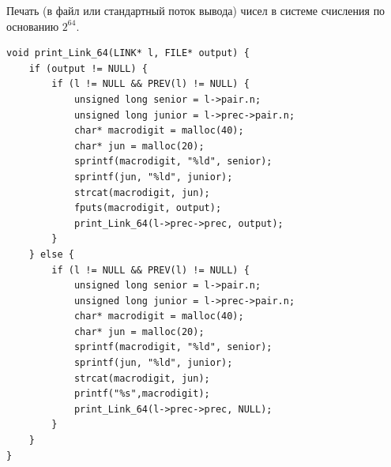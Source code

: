 \documentclass[14pt, russian]{scrartcl}
\begin{document}
\newpage
\begin{code}
\caption{Печать (в файл или стандартный поток вывода) чисел в системе счисления по основанию $2^{64}$.}
\label{lst:octaladd}
\begin{verbatim}
void print_Link_64(LINK* l, FILE* output) {
    if (output != NULL) {
        if (l != NULL && PREV(l) != NULL) {
            unsigned long senior = l->pair.n;
            unsigned long junior = l->prec->pair.n;
            char* macrodigit = malloc(40);
            char* jun = malloc(20);
            sprintf(macrodigit, "%ld", senior);
            sprintf(jun, "%ld", junior);
            strcat(macrodigit, jun);
            fputs(macrodigit, output);
            print_Link_64(l->prec->prec, output);
        }
    } else {
        if (l != NULL && PREV(l) != NULL) {
            unsigned long senior = l->pair.n;
            unsigned long junior = l->prec->pair.n;
            char* macrodigit = malloc(40);
            char* jun = malloc(20);
            sprintf(macrodigit, "%ld", senior);
            sprintf(jun, "%ld", junior);
            strcat(macrodigit, jun);
            printf("%s",macrodigit);
            print_Link_64(l->prec->prec, NULL);
        }
    }
}
\end{verbatim}
\end{code}
\end{document}
